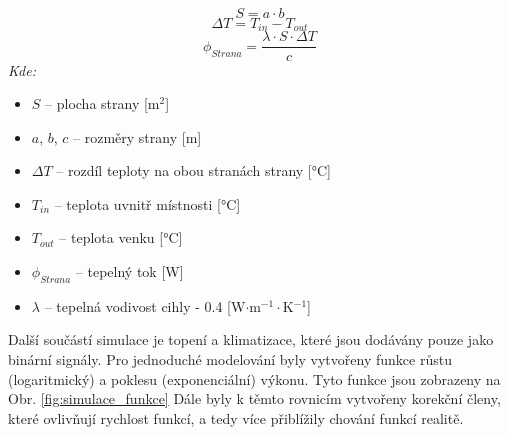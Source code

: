 \begin{equation}
    S = a \cdot b
    \label{eq:plocha}
\end{equation}
\begin{equation}
    \Delta T = T_{in} - T_{out}
    \label{eq:rozdil_teplot}
\end{equation}
\begin{equation}
    \phi _{Strana} = \frac{\lambda \cdot S \cdot \Delta T}{c}
    \label{eq:tepelny_tok}
\end{equation}
\noindent\textit{Kde:}
\begin{itemize}
    \item $S$ -- plocha strany [m$^2$]
    \item $a$, $b$, $c$ -- rozměry strany [m]
    \item $\Delta T$ -- rozdíl teploty na obou stranách strany [°C]
    \item $T_{in}$ -- teplota uvnitř místnosti [°C]
    \item $T_{out}$ -- teplota venku [°C]
    \item $\phi _{Strana}$ -- tepelný tok [W]
    \item $\lambda$ -- tepelná vodivost cihly - 0.4 [W$\cdot$m$^{-1}\cdot$K$^{-1}$] \newline
\end{itemize}
\noindent Další součástí simulace je topení a klimatizace, které jsou dodávány pouze jako binární signály. Pro jednoduché modelování byly vytvořeny funkce růstu (logaritmický) a poklesu (exponenciální) výkonu. Tyto funkce jsou zobrazeny na Obr. \ref{fig:simulace_funkce} Dále byly k těmto rovnicím vytvořeny korekční členy, které ovlivňují rychlost funkcí, a tedy více přiblížily chování funkcí realitě.

